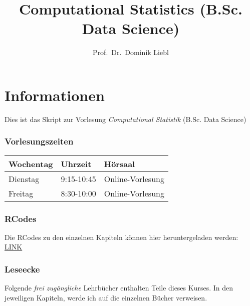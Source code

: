 \documentclass[
  ngerman,
]{book}
\title{Computational Statistics (B.Sc. Data Science)}
\author{Prof.~Dr.~Dominik Liebl}
\date{}
\begin{document}
\maketitle

{
\setcounter{tocdepth}{1}
\tableofcontents
}
\hypertarget{informationen}{%
\chapter*{Informationen}\label{informationen}}

Dies ist das Skript zur Vorlesung \emph{Computational Statistik} (B.Sc. Data Science)

\hypertarget{vorlesungszeiten}{%
\subsection*{Vorlesungszeiten}\label{vorlesungszeiten}}

\begin{table}[H]
\centering
\begin{tabular}[t]{l|l|l}
\hline
Wochentag & Uhrzeit & Hörsaal\\
\hline
Dienstag & 9:15-10:45 & Online-Vorlesung\\
\hline
Freitag & 8:30-10:00 & Online-Vorlesung\\
\hline
\end{tabular}
\end{table}

\hypertarget{rcodes}{%
\subsection*{RCodes}\label{rcodes}}

Die RCodes zu den einzelnen Kapiteln können hier heruntergeladen werden: \href{https://github.com/lidom/Computational_Statistics_Script/tree/main/RCodes}{LINK}

\hypertarget{leseecke}{%
\subsection*{Leseecke}\label{leseecke}}

Folgende \emph{frei zugängliche} Lehrbücher enthalten Teile dieses Kurses. In den jeweiligen Kapiteln, werde ich auf die einzelnen Bücher verweisen.
\end{document}
